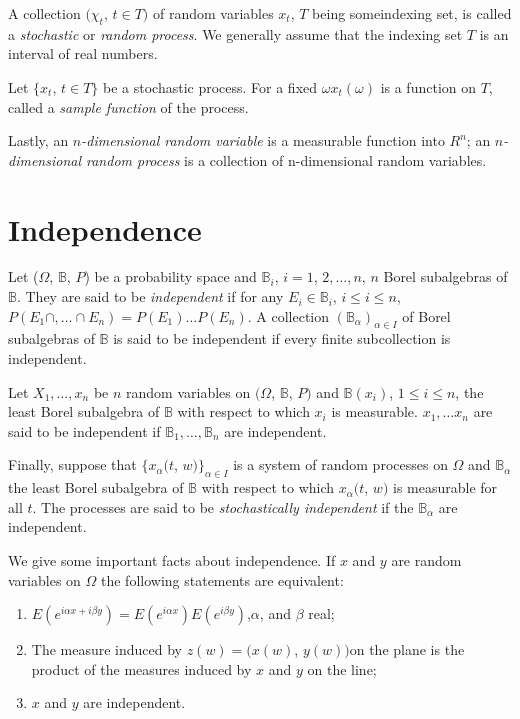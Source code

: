 A collection $(\chi_t$, $ t \in T)$ of random variables $x_t$, $ T$
being some\pageoriginale indexing set, is called a \textit{stochastic}
or  \textit{random process}. We generally assume that the indexing set $T$ is an
interval of real numbers. 

Let $\{ x_t$, $ t \in T\}$ be a stochastic process. For a fixed 
$\omega x_t (\omega)$ is a function on $T$, called a
\textit{sample function} of the process. 

Lastly, an \textit{$n$-dimensional random variable } is a measurable
function into $R^n$; an \textit{$n$-dimensional random process} is a
collection of n-dimensional random variables. 

\section{Independence}\label{chap0-sec3}  

Let ($\Omega$, $\mathbb{B}$, $P$) be a probability space and
$\mathbb{B}_i$, $ i = 1$, $2, \ldots,n$, $n$ Borel subalgebras of
$\mathbb{B}$. They are said to be \textit{independent} if for any
$E_i \in \mathbb{B}_i$, $i \leq i \leq n$, $P(E_1 \cap, \ldots \cap
E_n) = P(E_1) \ldots P(E_n)$. A collection
$(\mathbb{B}_{\alpha})_{\alpha \in I}$ of Borel subalgebras of
$\mathbb{B}$ is said to be independent if every finite subcollection
is independent. 

Let $X_1, \ldots, x_n$ be $n$ random variables on $(\Omega$, $
\mathbb{B}$, $ P)$ and $\mathbb{B}(x_i)$, $ 1 \leq i \leq n$, the
least Borel subalgebra of $\mathbb{ B}$ with respect to which $x_i$ is
measurable. $x_1, \ldots x_n$ are said to be independent if
$\mathbb{B}_1, \ldots, \mathbb{B}_n$ are independent. 

Finally, suppose that $\{ x_{\alpha}(t$, $w) \}_{\alpha \in I}$ is a
system of random processes on $\Omega$ and $\mathbb{B}_{\alpha}$ the
least Borel subalgebra of $\mathbb{B}$ with respect to which
$x_{\alpha}(t$, $w)$ is measurable for all $t$. The processes are said
to be \textit{stochastically independent} if the
$\mathbb{B}_{\alpha}$ are independent. 

We give some important facts about independence. If $x$ and $y$ are
random variables on $\Omega$ the following statements are equivalent: 
\begin{enumerate}[(1)]
\item $E(e^{i \alpha x + i \beta y}) = E(e^{i \alpha x}) E(e^{i \beta
  y})$,\pageoriginale $\alpha$, and $\beta$ real; 

\item The measure induced by $z(w) = (x(w) $, $ y(w))$on the plane is
  the product of the measures induced by $x$ and $y$ on the line; 
\item $x$ and $y$ are independent.
\end{enumerate}

